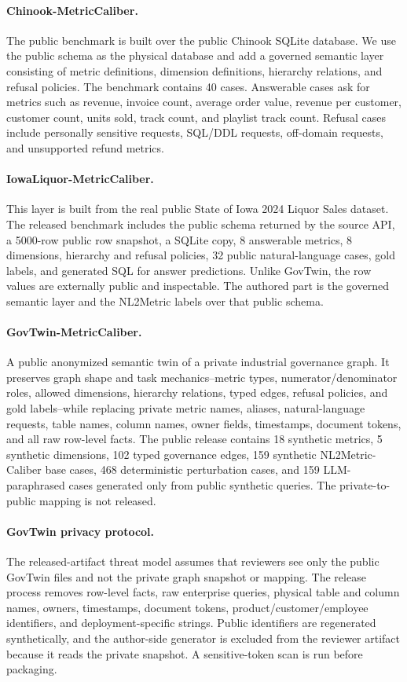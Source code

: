 \documentclass[letterpaper]{article}
\begin{document}
\paragraph{Chinook-MetricCaliber.}
The public benchmark is built over the public Chinook SQLite database. We use the public schema as the physical database and add a governed semantic layer consisting of metric definitions, dimension definitions, hierarchy relations, and refusal policies. The benchmark contains 40 cases. Answerable cases ask for metrics such as revenue, invoice count, average order value, revenue per customer, customer count, units sold, track count, and playlist track count. Refusal cases include personally sensitive requests, SQL/DDL requests, off-domain requests, and unsupported refund metrics.

\paragraph{IowaLiquor-MetricCaliber.}
This layer is built from the real public State of Iowa 2024 Liquor Sales dataset. The released benchmark includes the public schema returned by the source API, a 5000-row public row snapshot, a SQLite copy, 8 answerable metrics, 8 dimensions, hierarchy and refusal policies, 32 public natural-language cases, gold labels, and generated SQL for answer predictions. Unlike GovTwin, the row values are externally public and inspectable. The authored part is the governed semantic layer and the NL2Metric labels over that public schema.

\paragraph{GovTwin-MetricCaliber.}
A public anonymized semantic twin of a private industrial governance graph. It preserves graph shape and task mechanics--metric types, numerator/denominator roles, allowed dimensions, hierarchy relations, typed edges, refusal policies, and gold labels--while replacing private metric names, aliases, natural-language requests, table names, column names, owner fields, timestamps, document tokens, and all raw row-level facts. The public release contains 18 synthetic metrics, 5 synthetic dimensions, 102 typed governance edges, 159 synthetic NL2Metric-Caliber base cases, 468 deterministic perturbation cases, and 159 LLM-paraphrased cases generated only from public synthetic queries. The private-to-public mapping is not released.

\paragraph{GovTwin privacy protocol.}
The released-artifact threat model assumes that reviewers see only the public GovTwin files and not the private graph snapshot or mapping. The release process removes row-level facts, raw enterprise queries, physical table and column names, owners, timestamps, document tokens, product/customer/employee identifiers, and deployment-specific strings. Public identifiers are regenerated synthetically, and the author-side generator is excluded from the reviewer artifact because it reads the private snapshot. A sensitive-token scan is run before packaging.
\end{document}
